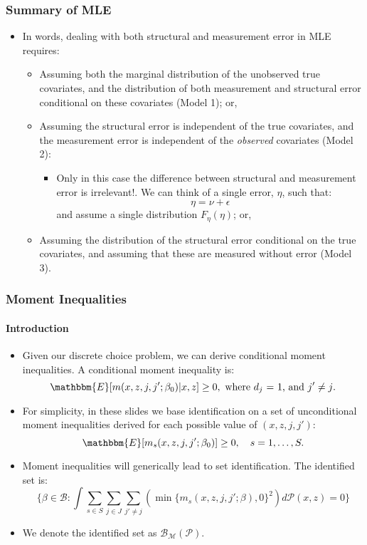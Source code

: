 \begin{frame}
\frametitle{Summary of MLE}

\begin{itemize}
	\item In words, dealing with both structural and measurement error  in MLE requires:
	\begin{itemize}
		\item Assuming both the marginal distribution of the unobserved true covariates, and the distribution of both measurement and structural error conditional on these covariates (Model 1); or,
		\item Assuming the structural error is independent of the true covariates, and the measurement error is independent of the \textit{observed} covariates (Model 2):
		\begin{itemize}
			\item Only in this case the difference between structural and measurement error is irrelevant!. We can think of a single error, $\eta$, such that:
			\begin{equation*}
			\eta = \nu + \epsilon
			\end{equation*}
			and assume a single distribution $F_{\eta}(\eta)$; or,
		\end{itemize}
		\item Assuming the distribution of the structural error conditional on the true covariates, and assuming that these are measured without error (Model 3).
	\end{itemize}
\end{itemize}
\end{frame}
\begin{frame}
\frametitle{Moment Inequalities}
\framesubtitle{Introduction}

\begin{itemize}
	\item Given our discrete choice problem, we can derive conditional moment inequalities. A conditional moment inequality is:
	\begin{equation*}
	\mathbbm{E}[m(x,z,j,j';\beta_{0})|x,z]\geq 0,\text{ where $d_{j}$ $=$ $1$, and $j'\neq j$}.
	\end{equation*}
	\item For simplicity, in these slides we base identification on a set of unconditional moment inequalities derived for each possible value of $(x,z,j,j')$:
	\begin{equation*}
	\mathbbm{E}[m_{s}(x,z,j,j';\beta_{0})]\geq 0,\quad s=1,\dots,S.
	\end{equation*}
	\item Moment inequalities will generically lead to set identification. The identified set is:
	\begin{equation*}
	\{\beta\in\mathcal{B}:\int\sum_{s\in S}\sum_{j\in J}\sum_{j'\neq j}(\min\{m_{s}(x,z,j,j';\beta),0\}^{2})d\mathcal{P}(x,z)=0\}
	\end{equation*}
	\item We denote the identified set as $\mathcal{B}_{\mathcal{M}}(\mathcal{P})$.
\end{itemize}
\end{frame}
